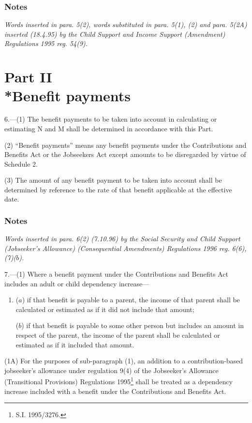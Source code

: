 \documentclass[a4paper]{article}
\newcommand{\parthead}{}
\newcommand\amendment[1]{\subsubsection*{Notes}{\itshape\frenchspacing\footnotesize #1 \par\goodbreak}}
\begin{document}
\amendment{
Words inserted in para. 5(2), words substituted in para. 5(1), (2) and para. 5(2A) inserted (18.4.95) by the Child Support and Income Support (Amendment) Regulations 1995 reg. 54(9).
}

\section[Part II --- Benefit payments]{Part II\\*Benefit payments}

\renewcommand\parthead{--- Schedule 1 Part II}

6.—(1) The benefit payments to be taken into account in calculating or estimating N and M shall be determined in accordance with this Part.

(2) “Benefit payments” means any benefit payments under the Contributions and Benefits Act 
or the Jobseekers Act  %
except amounts to be disregarded by virtue of Schedule 2.

(3) The amount of any benefit payment to be taken into account shall be determined by reference to the rate of that benefit applicable at the effective date.

\amendment{
Words inserted in para. 6(2) (7.10.96) by the Social Security and Child Support (Jobseeker's Allowance) (Consequential Amendments) Regulations 1996 reg. 6(6), (7)($b$).
}

\medskip

7.—(1) Where a benefit payment under the Contributions and Benefits Act includes an adult or child dependency increase—
\begin{enumerate}\item[]
($a$) if that benefit is payable to a parent, the income of that parent shall be calculated or estimated as if it did not include that amount;

($b$) if that benefit is payable to some other person but includes an amount in respect of the parent, the income of the parent shall be calculated or estimated as if it included that amount.
\end{enumerate}

(1A) For the purposes of sub-paragraph (1), an addition to a contribution-based jobseeker’s allowance under regulation 9(4) of the Jobseeker’s Allowance (Transitional Provisions) Regulations 1995\footnote{\frenchspacing S.I. 1995/3276.} shall be treated as a dependency increase included with a benefit under the Contributions and Benefits Act.
\end{document}
